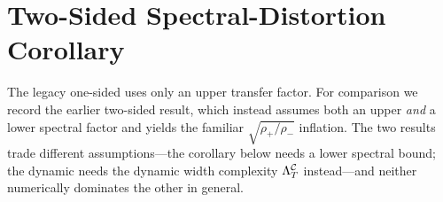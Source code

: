 \section{Two-Sided Spectral-Distortion Corollary}\label{app:cor}

The legacy one-sided  uses only an upper
transfer factor.  For comparison we record the earlier two-sided result,
which instead assumes both an upper \emph{and} a lower spectral factor and
yields the familiar $\sqrt{\rho_+/\rho_-}$ inflation.  The two results trade
different assumptions---the corollary below needs a lower spectral bound;
the dynamic  needs the dynamic width complexity
$\Lambda^{\mathcal{C}}_T$ instead---and neither numerically dominates the other in
general.

